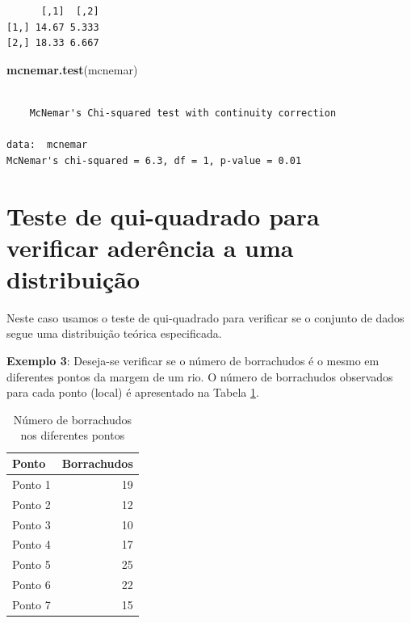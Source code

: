 \documentclass[12pt,brazil,oneside]{book}
\newenvironment{Shaded}{\begin{snugshade}}{\end{snugshade}}
\newcommand{\KeywordTok}[1]{\textcolor[rgb]{0.13,0.29,0.53}{\textbf{#1}}}
\newcommand{\NormalTok}[1]{#1}
\begin{document}
\begin{verbatim}
      [,1]  [,2]
[1,] 14.67 5.333
[2,] 18.33 6.667
\end{verbatim}

\begin{Shaded}
\begin{Highlighting}[]
\KeywordTok{mcnemar.test}\NormalTok{(mcnemar)}
\end{Highlighting}
\end{Shaded}

\begin{verbatim}

    McNemar's Chi-squared test with continuity correction

data:  mcnemar
McNemar's chi-squared = 6.3, df = 1, p-value = 0.01
\end{verbatim}

\hypertarget{teste-de-qui-quadrado-para-verificar-aderencia-a-uma-distribuicao}{%
\section{Teste de qui-quadrado para verificar aderência a uma
distribuição}\label{teste-de-qui-quadrado-para-verificar-aderencia-a-uma-distribuicao}}

Neste caso usamos o teste de qui-quadrado para verificar se o conjunto
de dados segue uma distribuição teórica especificada.

\textbf{Exemplo 3}: Deseja-se verificar se o número de borrachudos é o
mesmo em diferentes pontos da margem de um rio. O número de borrachudos
observados para cada ponto (local) é apresentado na Tabela
\ref{tab:borrach}.

\begin{table}

\caption{\label{tab:borrach}Número de borrachudos nos diferentes pontos}
\centering
\begin{tabular}[t]{l|r}
\hline
Ponto & Borrachudos\\
\hline
Ponto 1 & 19\\
\hline
Ponto 2 & 12\\
\hline
Ponto 3 & 10\\
\hline
Ponto 4 & 17\\
\hline
Ponto 5 & 25\\
\hline
Ponto 6 & 22\\
\hline
Ponto 7 & 15\\
\hline
\end{tabular}
\end{table}
\end{document}
